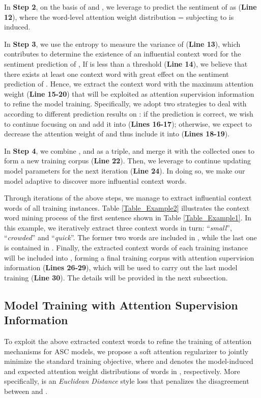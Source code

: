 \documentclass[11pt,a4paper]{article}
\begin{document}
In \textbf{Step 2},
on the basis of  and ,
we leverage  to predict the sentiment of  as  (\textbf{Line 12}),
where the word-level attention weight distribution =
subjecting to  is induced.


In \textbf{Step 3},
we use the entropy  to measure the variance of  (\textbf{Line 13}),
which contributes to determine the existence of an influential context word for the sentiment prediction of ,
If  is less than a threshold  (\textbf{Line 14}),
we believe that there exists at least one context word with great effect on the sentiment prediction of .
Hence,
we extract the context word  with the maximum attention weight (\textbf{Line 15-20})
that will be exploited as attention supervision information to refine the model training.
Specifically,
we adopt two strategies to deal with  according to different prediction results on :
if the prediction is correct,
we wish to continue focusing on  and add it into  (\textbf{Lines 16-17});
otherwise,
we expect to decrease the attention weight of  and thus include it into  (\textbf{Lines 18-19}).


In \textbf{Step 4},
we combine ,  and  as a triple,
and merge it with the collected ones to form a new training corpus  (\textbf{Line 22}).
Then,
we leverage  to continue updating model parameters for the next iteration (\textbf{Line 24}).
In doing so,
we make our model adaptive to discover more influential context words.

Through  iterations of the above steps,
we manage to extract influential context words of all training instances.
Table \ref{Table_Example2} illustrates the context word mining process of the first sentence shown in Table \ref{Table_Example1}.
In this example,
we iteratively extract three context words in turn: ``\emph{small}'', ``\emph{crowded}'' and ``\emph{quick}''.
The former two words are included in ,
while the last one is contained in .
Finally,
the extracted context words of each training instance will be included into ,
forming a final training corpus  with
attention supervision information (\textbf{Lines 26-29}),
which will be used to carry out the last model training (\textbf{Line 30}).
The details will be provided in the next subsection.


\subsection{Model Training with Attention Supervision Information} \label{SubSection_ModelTraining}

To exploit the above extracted context words to refine the training of attention mechanisms for ASC models,
we propose a soft attention regularizer  to jointly minimize the standard training objective,
where  and  denotes the model-induced and expected attention weight distributions of words in , respectively.
More specifically,
 is an \emph{Euclidean Distance} style loss that penalizes the disagreement between  and .
\end{document}
